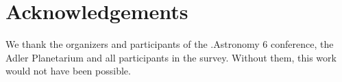 \section{Acknowledgements}

We thank the organizers and participants of the .Astronomy 6 conference, the Adler Planetarium and all participants in the survey.  Without them, this work would not have been possible.
